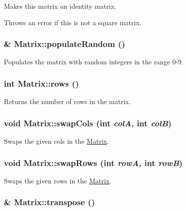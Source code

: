 Makes this matrix an identity matrix. 

Throws an error if this is not a square matrix. \hypertarget{class_matrix_375fc575a7e042d0eed3d76c7470e59f}{
\subsubsection[{populateRandom}]{ \& Matrix::populateRandom ()}}
\label{class_matrix_375fc575a7e042d0eed3d76c7470e59f}


Populates the matrix with random integers in the range 0-9. 

\hypertarget{class_matrix_dd9c23e5ff5e2456a8d48024ab19fe96}{
\subsubsection[{rows}]{\setlength{\rightskip}{0pt plus 5cm}int Matrix::rows ()}}
\label{class_matrix_dd9c23e5ff5e2456a8d48024ab19fe96}


Returns the number of rows in the matrix. 

\hypertarget{class_matrix_505f924baa7c236280751499da56ecee}{
\subsubsection[{swapCols}]{\setlength{\rightskip}{0pt plus 5cm}void Matrix::swapCols (int {\em colA}, \/  int {\em colB})}}
\label{class_matrix_505f924baa7c236280751499da56ecee}


Swaps the given cols in the \hyperlink{class_matrix}{Matrix}. 

\hypertarget{class_matrix_c0e73d5e98817e12b82a3f626c8343de}{
\subsubsection[{swapRows}]{\setlength{\rightskip}{0pt plus 5cm}void Matrix::swapRows (int {\em rowA}, \/  int {\em rowB})}}
\label{class_matrix_c0e73d5e98817e12b82a3f626c8343de}


Swaps the given rows in the \hyperlink{class_matrix}{Matrix}. 

\hypertarget{class_matrix_d609fedfd61e93679803bb114e544569}{
\subsubsection[{transpose}]{ \& Matrix::transpose ()}}
\label{class_matrix_d609fedfd61e93679803bb114e544569}


